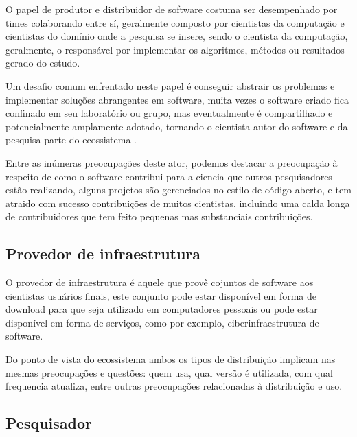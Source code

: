 O papel de produtor e distribuidor de software costuma ser desempenhado por
times colaborando entre sí, geralmente composto por cientistas da computação e
cientistas do domínio onde a pesquisa se insere, sendo o cientista da
computação, geralmente, o responsável por implementar os algoritmos, métodos ou
resultados gerado do estudo.

Um desafio comum enfrentado neste papel é conseguir abstrair os problemas e
implementar soluções abrangentes em software, muita vezes o software criado
fica confinado em seu laboratório ou grupo, mas eventualmente é compartilhado e
potencialmente amplamente adotado, tornando o cientista autor do software e da
pesquisa parte do ecossistema \cite{howison2015understanding}.


Entre as inúmeras preocupações deste ator, podemos destacar a preocupação à
respeito de como o software contribui para a ciencia que outros pesquisadores
estão realizando, alguns projetos são gerenciados no estilo de código aberto, e
tem atraido com sucesso contribuições de muitos cientistas, incluindo uma calda
longa de contribuidores que tem feito pequenas mas substanciais contribuições.


\subsection{Provedor de infraestrutura}

O provedor de infraestrutura é aquele que provê cojuntos de software aos
cientistas usuários finais, este conjunto pode estar disponível em forma de
download para que seja utilizado em computadores pessoais ou pode estar
disponível em forma de serviços, como por exemplo, ciberinfraestrutura de
software.


Do ponto de vista do ecossistema ambos os tipos de distribuição implicam nas
mesmas preocupações e questões: quem usa, qual versão é utilizada, com qual
frequencia atualiza, entre outras preocupações relacionadas à distribuição e
uso.

\subsection{Pesquisador}


